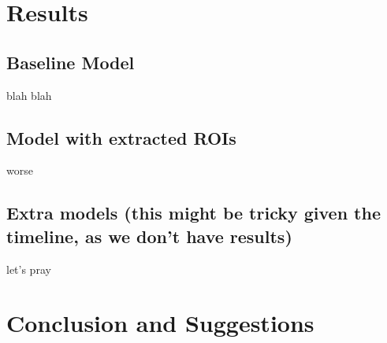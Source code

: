 \documentclass[conference]{IEEEtran}
\begin{document}
\section{Results}
\subsection{Baseline Model}
blah blah
\subsection{Model with extracted ROIs}
worse 
\subsection{Extra models (this might be tricky given the timeline, as we don't have results)}
let's pray
\section{Conclusion and Suggestions}
\end{document}
